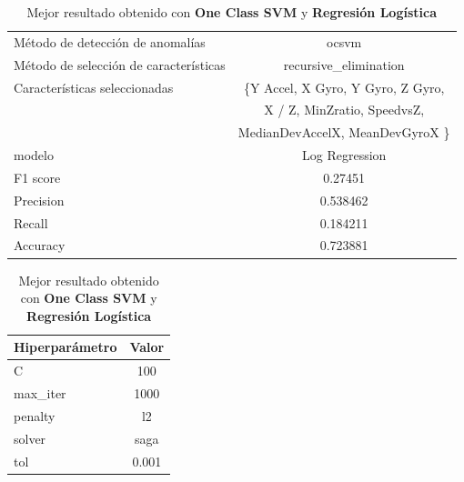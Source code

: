 \begin{appendices}
		\begin{table}[htb]
			\centering
			\caption{Mejor resultado obtenido con \textbf{One Class SVM} y \textbf{Regresión Logística}}
			\label{table:32}
			\begin{tabular}{lc}
				\toprule
					  Método de detección de anomalías &                                              ocsvm \\
				Método de selección de características &                              recursive\_elimination \\
						 Características seleccionadas & \{Y Accel, X Gyro, Y Gyro, Z Gyro, \\ 
						 							   &  X / Z,  MinZratio, SpeedvsZ, \\
													   &  MedianDevAccelX, MeanDevGyroX \} \\
												modelo &                                     Log Regression \\
											  F1 score &                                            0.27451 \\
											 Precision &                                           0.538462 \\
												Recall &                                           0.184211 \\
											  Accuracy &                                           0.723881 \\
				\bottomrule
				\end{tabular}
			\newline
			\newline

			\begin{tabular}{lc}
				\toprule
				Hiperparámetro &  Valor \\
				\midrule
							 C &    100 \\
					  max\_iter &   1000 \\
					   penalty &     l2 \\
						solver &   saga \\
						   tol &  0.001 \\
				\bottomrule
				\end{tabular}
			

\end{table}
\end{appendices}

